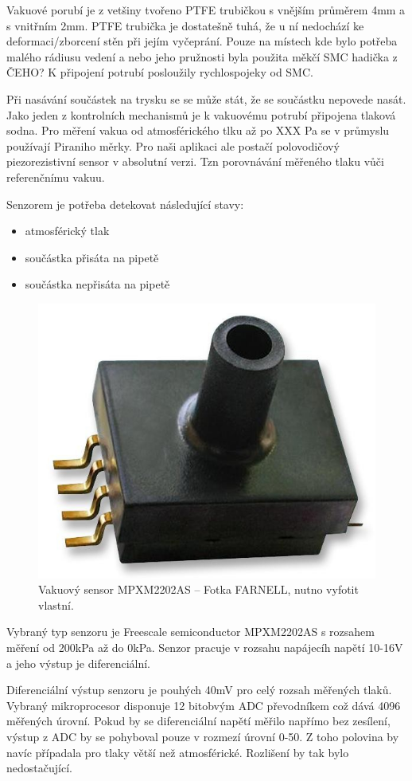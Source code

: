 Vakuové porubí je z vetšiny tvořeno PTFE trubičkou s vnějším průměrem 4mm a s vnitřním 2mm. PTFE trubička je dostatešně tuhá, že u ní nedochází ke deformaci/zborcení stěn při jejím vyčeprání. Pouze na místech kde bylo potřeba malého rádiusu vedení a nebo jeho pružnosti byla použita měkčí SMC hadička z ČEHO? K připojení potrubí posloužily rychlospojeky od SMC.

Při nasávání součástek na trysku se se může stát, že se součástku nepovede nasát. Jako jeden z kontrolních mechanismů je k vakuovému potrubí připojena tlaková sodna. Pro měření vakua od atmosférického tlku až po XXX Pa se v průmyslu používají Piraniho měrky. Pro naši aplikaci ale postačí polovodičový piezorezistivní sensor v absolutní verzi. Tzn porovnávání měřeného tlaku vůči referenčnímu vakuu. 

Senzorem je potřeba detekovat následující stavy:
\begin{itemize}
\item atmosférický tlak
\item součástka přisáta na pipetě
\item součástka nepřisáta na pipetě
\end{itemize}


\begin{figure}[h!]
  \centering
    \includegraphics[width=0.4\linewidth]{obrazky/sensor.jpg}%
    \caption{Vakuový sensor  MPXM2202AS – Fotka FARNELL, nutno vyfotit vlastní.}
    \label{fig:sensor}
\end{figure}

Vybraný typ senzoru je Freescale semiconductor MPXM2202AS s rozsahem měření od 200kPa až do 0kPa.  Senzor pracuje v rozsahu napájecíh napětí 10-16V a jeho výstup je diferenciální.

Diferenciální výstup senzoru je pouhých 40mV pro celý rozsah měřených tlaků. Vybraný mikroprocesor disponuje 12 bitobvým ADC převodníkem což dává  4096 měřených úrovní. Pokud by se diferenciální napětí měřilo napřímo bez zesílení, výstup z ADC by se pohyboval pouze v rozmezí úrovní 0-50. Z toho polovina by navíc případala pro tlaky větší než atmosférické.  Rozlišení by tak bylo nedostačující.

